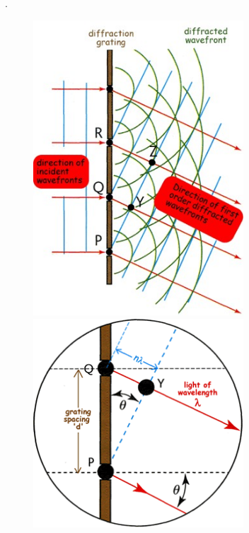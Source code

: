 .	\begin{figure}[htbp]
		\begin{minipage}[c]{0.5\linewidth}
			\centering
			\includegraphics[width=0.7\textwidth]{../Images/grating_to_split_light.jpg}
			\caption{\label{fig:grating_to_split_light}}
		\end{minipage}
		\begin{minipage}[c]{0.5\linewidth}
			\centering
			\includegraphics[width=0.7\textwidth]{../Images/grating_close_up.png}
			\caption{\label{fig:grating_close_up}}
		\end{minipage}
	\end{figure}

